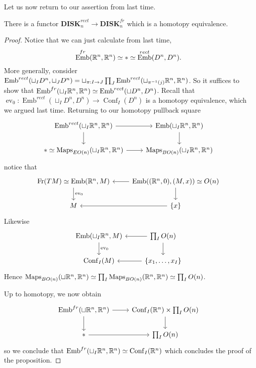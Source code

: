 \documentclass{amsart}
\DeclareMathOperator{\Emb}{Emb}
\DeclareMathOperator{\Conf}{Conf}
\DeclareMathOperator{\ev}{ev}
\begin{document}
Let us now return to our assertion from last time.
\begin{proposition}
    There is a functor $\mathbf{DISK}_n^{rect}\to \mathbf{DISK}_n^{fr}$ which is a homotopy
    equivalence.
\end{proposition}
\begin{proof}
    Notice that we can just calculate from last time,
    \begin{equation*}
        \Emb^{fr}(\R^n, \R^n) \simeq * \simeq \Emb^{rect}(D^n, D^n).
    \end{equation*}
    More generally, consider $\Emb^{rect}(\sqcup_I D^n, \sqcup_J D^n)=\sqcup_{\pi:I\to J}\prod_J\Emb^{rect}(\sqcup_{\pi^{-1}(j)}\R^n,\R^n)$.
    So it suffices to show that $\Emb^{fr}(\sqcup_I\R^n,\R^n)\simeq\Emb^{rect}(\sqcup D^n, D^n)$.
    Recall that $\ev_0:\Emb^{rect}(\sqcup_I D^n,D^n)\to \Conf_I(D^n)$ is a homotopy
    equivalence, which we argued last time. Returning to our homotopy pullback square
    \begin{equation*}
        \begin{tikzcd}
            \Emb^{rect}(\sqcup_I \R^n, \R^n) \rar\dar & \Emb(\sqcup_I\R^n,\R^n)\dar \\
            *\simeq \Maps_{EO(n)}(\sqcup_I \R^n,\R^n) \rar & \Maps_{BO(n)}(\sqcup_I \R^n,\R^n)
        \end{tikzcd}
    \end{equation*}
    notice that
    \begin{equation*}
        \begin{tikzcd}
            \text{Fr}(TM)\simeq \Emb(\R^n, M)\dar{\ev_0} & \Emb( (\R^n,0), (M,x))\lar\dar \simeq O(n) \\
            M & \{x\}\lar
        \end{tikzcd}
    \end{equation*}
    Likewise
    \begin{equation*}
        \begin{tikzcd}
            \Emb(\sqcup_I \R^n, M)\dar{\ev_0} & \prod_I O(n)\lar \dar\\
            \Conf_I(M) & \{x_1,\ldots,x_I\}\lar
        \end{tikzcd}
    \end{equation*}
    Hence $\operatorname{Maps}_{BO(n)}(\sqcup\mathbb{R}^n,\mathbb{R}^n)\simeq \prod_I\operatorname{Maps}_{BO(n)}(\mathbb{R}^n,\mathbb{R}^n)\simeq\prod_IO(n)$.

    Up to homotopy, we now obtain
    \begin{equation*}
        \begin{tikzcd}
            \Emb^{fr}(\sqcup\R^n,\R^n) \rar\dar & \Conf_I(\R^n)\times \prod_I O(n)\dar \\
            * \rar & \prod_I O(n)
        \end{tikzcd}
    \end{equation*}
    so we conclude that $\Emb^{fr}(\sqcup_I\R^n,\R^n)\simeq \Conf_I(\R^n)$ which concludes
    the proof of the proposition.
\end{proof}
\end{document}
